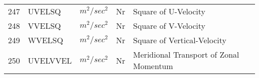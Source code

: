 \begin{tabular}{lllll}
247& UVELSQ   & $m^2/sec^2$ & Nr
         &\begin{minipage}[t]{3in}
          {Square of U-Velocity} 
         \end{minipage}\\
248& VVELSQ   & $m^2/sec^2$ & Nr
         &\begin{minipage}[t]{3in}
          {Square of V-Velocity} 
         \end{minipage}\\
249& WVELSQ   & $m^2/sec^2$ & Nr
         &\begin{minipage}[t]{3in}
          {Square of Vertical-Velocity} 
         \end{minipage}\\
250& UVELVVEL & $m^2/sec^2$ & Nr
         &\begin{minipage}[t]{3in}
          {Meridional Transport of Zonal Momentum} 
         \end{minipage}\\
\end{tabular}
\vspace{1.5in}
\vfill

